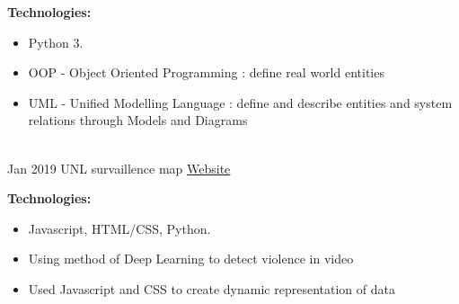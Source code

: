 \documentclass[letterpaper]{twentysecondcv} %
\begin{document}
\begin{twenty}
{       	\textbf{Technologies:}
        {\begin{itemize}
        \item Python 3.
        \item OOP - Object Oriented Programming : define real world entities 
        \item UML - Unified Modelling Language : define and describe entities and system relations
        through Models and Diagrams
		\end{itemize}}
        }
    \\
        \twentyitem
    	{Jan 2019}
		{}
        {UNL survaillence map}
        {\href{https://datduyng.github.io/cornhack2019/}{Website}} %
        {}
        {
       	\textbf{Technologies:}
        {\begin{itemize}
        \item Javascript, HTML/CSS, Python.
        \item Using method of Deep Learning to detect violence in video
        \item Used Javascript and CSS to create dynamic representation of data
		\end{itemize}}
        }
        \\

\end{twenty}



	
\end{document}
